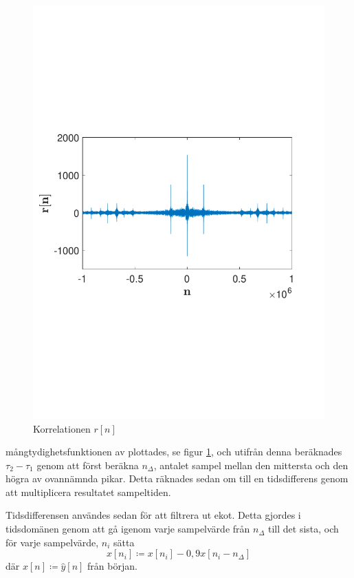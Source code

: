 \documentclass[10pt,twocolumn,a4paper]{article}
\begin{document}
\begin{figure}
    \includegraphics[trim = 0 80mm 0 90mm, clip, width=\linewidth]{fig1.pdf}
    \caption{
        Korrelationen $r[n]$ 
        \label{fig:z}
    }
\end{figure}

mångtydighetsfunktionen av \yhat  plottades, se figur \ref{fig:z}, och
utifrån denna beräknades $\tau_2 - \tau_1$ genom att först beräkna
$n_\Delta$, antalet sampel mellan den mittersta och den högra av ovannämnda
pikar. Detta räknades sedan om till en tidsdifferens genom att multiplicera
resultatet sampeltiden.

Tidsdifferensen användes sedan för att filtrera ut ekot. Detta gjordes i
tidsdomänen genom att gå igenom varje sampelvärde från $n_\Delta$ till det
sista, och för varje sampelvärde, $n_i$ sätta 
\begin{equation}
x[n_i] \coloneqq x[n_i] - 0,9x[n_i - n_\Delta] 
\label{e4}
\end{equation}
där $x[n] \coloneqq \hat{y}[n]$ från början.
\end{document}
